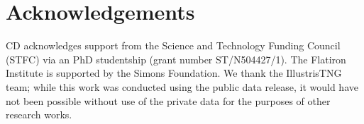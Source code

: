 \documentclass[fleqn,usenatbib]{mnras}
\begin{document}

\section*{Acknowledgements}
CD acknowledges support from the Science and Technology Funding Council (STFC) via an PhD studentship (grant number ST/N504427/1). The Flatiron Institute is supported by the Simons Foundation. We thank the IllustrisTNG team; while this work was conducted using the public data release, it would have not been possible without use of the private data for the purposes of other research works. 

\vspace{-2em}



 



\label{lastpage}
\end{document}
